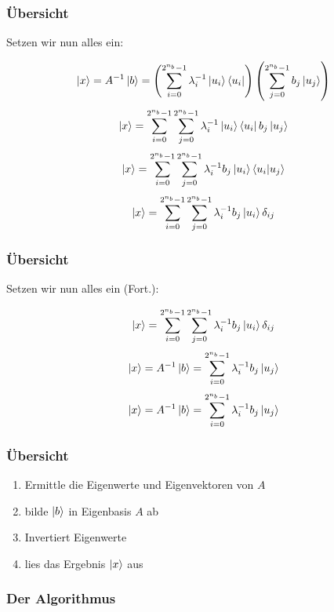     \begin{frame}
    \frametitle{Übersicht}

        Setzen wir nun alles ein:

        \hfil
        $$\ket{x} = A^{-1} \ket{b} = \left( \sum_{i=0}^{2^{n_b}-1} \lambda_i^{-1} \ket{u_i}\bra{u_i} \right) \left( \sum_{j=0}^{2^{n_b}-1} b_j\ket{u_j} \right)$$
        $$\ket{x}= \sum_{i=0}^{2^{n_b}-1} \sum_{j=0}^{2^{n_b}-1} \lambda_i^{-1} \ket{u_i}\bra{u_i} b_j\ket{u_j}$$
        $$\ket{x}= \sum_{i=0}^{2^{n_b}-1} \sum_{j=0}^{2^{n_b}-1} \lambda_i^{-1} b_j\ket{u_i}\braket{u_i| u_j}$$
        $$\ket{x} = \sum_{i=0}^{2^{n_b}-1} \sum_{j=0}^{2^{n_b}-1} \lambda_i^{-1} b_j\ket{u_i}\delta_{ij}$$

    \end{frame}


    \begin{frame}
    \frametitle{Übersicht}
        Setzen wir nun alles ein (Fort.):

        \hfil
        $$\ket{x} = \sum_{i=0}^{2^{n_b}-1} \sum_{j=0}^{2^{n_b}-1} \lambda_i^{-1} b_j\ket{u_i}\delta_{ij}$$
        $$\ket{x} =  A^{-1} \ket{b} = \sum_{i=0}^{2^{n_b}-1} \lambda_i^{-1} b_j\ket{u_j}$$
        $$\ket{x} =  A^{-1} \ket{b} = \sum_{i=0}^{2^{n_b}-1} \lambda_i^{-1} b_j\ket{u_j}$$

    \end{frame}

    \begin{frame}
    \frametitle{Übersicht}
        \begin{enumerate}
            \item Ermittle die Eigenwerte und Eigenvektoren von $A$
            \item bilde $\ket{b}$ in Eigenbasis $A$ ab
            \item  Invertiert Eigenwerte
            \item lies das Ergebnis $\ket{x}$ aus
        \end{enumerate}
    \end{frame}

\subsubsection{Der Algorithmus}

